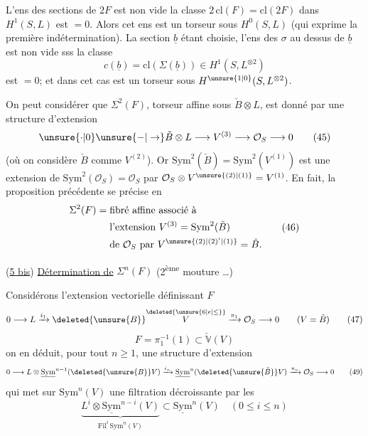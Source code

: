 L'ens des sections de $2F$ est   
 non vide  la classe $2\,\mathrm{cl}(F)=\mathrm{cl}(2F)$
dans $H^1(S,L)$ est $=0$. Alors cet ens est
un torseur sous $H^0(S,L)$ (qui exprime
la première indétermination). La section
$\underline b$ étant choisie, l'ens des $\sigma$ au dessus
de $\underline b$ est non vide sss la classe
\[
 c(\underline b)=\mathrm{cl}(\Sigma(\underline b))\in H^1(S,L^{\otimes2})
\]
est $=0$; et dans cet cas est un torseur
sous $H^{\unsure{1|0}}(S,L^{\otimes2})$.

On peut considérer que $\Sigma^2(F)$, torseur
affine sous $\check B\otimes L$, est donné par une
structure d'extension
\[
 \unsure{\cdot|0}\unsure{-|\to}\check B\otimes L\longrightarrow V^{(3)}\longrightarrow\mathcal O_S\longrightarrow0 \tag*{(45)}
\]
(où on considère $\check B$ comme $V^{(2)}$).
Or $\mathrm{Sym}^2(\check B)=\mathrm{Sym}^2(V^{(1)})$ est une
extension de $\mathrm{Sym}^2(\mathcal O_S)=\mathcal O_S$ par $\mathcal O_S\otimes V^{\unsure{(2)|(1)}}=V^{(1)}$.
En fait, la proposition précédente se
précise en
\[
\begin{aligned}
 \Sigma^2(F)={}&\text{fibré affine associé à}\\
 &\text{l'extension }V^{(3)}=\mathrm{Sym}^2(\check B)\\
 &\text{de }\mathcal O_S\text{ par }V^{\unsure{(2)|(2)'|(1)}}=\check B.
\end{aligned}
\tag*{(46)}
\]

(\uline{5 bis}) \uline{Détermination de} $\Sigma^n(F)$ (2\textsuperscript{ème} mouture \ldots)

Considérons l'extension vectorielle définissant $F$ 
\[
0\longrightarrow L\xrightarrow{i_1}\deleted{\unsure{B}}\overset{\deleted{\unsure{6|e|\leq}}}{V}\xrightarrow{\pi_1}\mathcal O_S\longrightarrow0 \qquad (V=\check B) \tag*{(47)}
\]
\[
 F=\pi_1^{-1}(1)\subset\check{\mathbb V}(V) \tag*{(48)}
\]
on en déduit, pour tout $n\geq1$, une structure
d'extension
\[
0\longrightarrow L\otimes\underline{\mathrm{Sym}}^{n-1}(\deleted{\unsure{B}}V)\xrightarrow{i_n}\underline{\mathrm{Sym}}^n(\deleted{\unsure{\check B}}V)\xrightarrow{\pi_n}\mathcal O_S\longrightarrow0 \tag*{(49)}
\]
qui  met sur $\mathrm{Sym}^n(V)$ une filtration
 décroissante par les
\[
\underbrace{L^i\otimes\underline{\mathrm{Sym}}^{n-i}(V)}_{\mathrm{Fil}^i\,\mathrm{Sym}^n(V)}\subset\underline{\mathrm{Sym}}^n(V)\quad(0\leq i\leq n) \tag*{(50)}
\]

